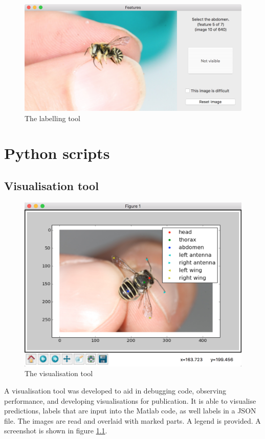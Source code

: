 \documentclass[11pt, oneside]{report}
\begin{document}
    \begin{figure}[h]
        \centering
        \includegraphics[width=\textwidth]{features_tool.png}\hfill
        \caption{The labelling tool}
        \label{fig:Labelling_screenshot}
    \end{figure}

\chapter{Python scripts}
    \section{Visualisation tool}
        \begin{figure}[h]
            \centering
            \includegraphics[width=\textwidth]{visualisation_tool.png}\hfill
            \caption{The visualisation tool}
            \label{fig:Visualisation_screenshot}
        \end{figure}
        A visualisation tool was developed to aid in debugging code, observing performance, and developing visualisations for publication. It is able to visualise predictions, labels that are input into the Matlab code, as well labels in a JSON file. The images are read and overlaid with marked parts. A legend is provided. A screenshot is shown in figure \ref{fig:Visualisation_screenshot}.
\end{document}
